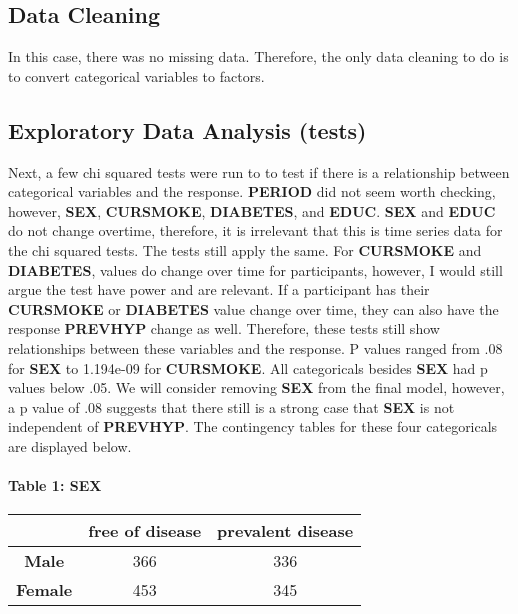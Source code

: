 \documentclass[11pt]{article}
\begin{document}
    \hypertarget{data-cleaning}{%
\subsection{Data Cleaning}\label{data-cleaning}}

    In this case, there was no missing data. Therefore, the only data
cleaning to do is to convert categorical variables to factors.

    \hypertarget{exploratory-data-analysis-tests}{%
\subsection{Exploratory Data Analysis
(tests)}\label{exploratory-data-analysis-tests}}

    Next, a few chi squared tests were run to to test if there is a
relationship between categorical variables and the response.
\textbf{PERIOD} did not seem worth checking, however, \textbf{SEX},
\textbf{CURSMOKE}, \textbf{DIABETES}, and \textbf{EDUC}. \textbf{SEX}
and \textbf{EDUC} do not change overtime, therefore, it is irrelevant
that this is time series data for the chi squared tests. The tests still
apply the same. For \textbf{CURSMOKE} and \textbf{DIABETES}, values do
change over time for participants, however, I would still argue the test
have power and are relevant. If a participant has their
\textbf{CURSMOKE} or \textbf{DIABETES} value change over time, they can
also have the response \textbf{PREVHYP} change as well. Therefore, these
tests still show relationships between these variables and the response.
P values ranged from .08 for \textbf{SEX} to 1.194e-09 for
\textbf{CURSMOKE}. All categoricals besides \textbf{SEX} had p values
below .05. We will consider removing \textbf{SEX} from the final model,
however, a p value of .08 suggests that there still is a strong case
that \textbf{SEX} is not independent of \textbf{PREVHYP}. The
contingency tables for these four categoricals are displayed below.

    \hypertarget{table-1-sex}{%
\paragraph{Table 1: SEX}\label{table-1-sex}}

    \begin{longtable}[]{@{}ccc@{}}
\toprule
~ & free of disease & prevalent disease\tabularnewline
\midrule
\endhead
\textbf{Male} & 366 & 336\tabularnewline
\textbf{Female} & 453 & 345\tabularnewline
\bottomrule
\end{longtable}
\end{document}
